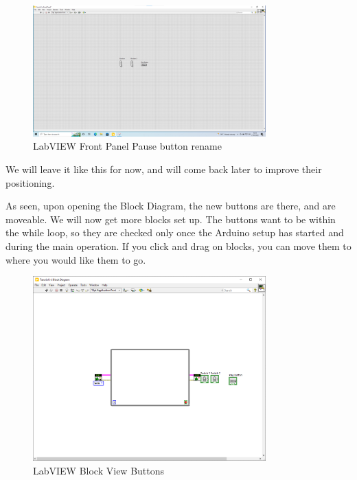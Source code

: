 \documentclass[a4paper,11pt]{report}
\begin{document}
\begin{figure}[H]
\centering
\includegraphics[width=0.8\textwidth]{screenshots/labview14}
\caption{LabVIEW Front Panel Pause button rename}
\end{figure}

We will leave it like this for now, and will come back later to improve their positioning.

As seen, upon opening the Block Diagram, the new buttons are there, and are moveable. We will now get more blocks set up. The buttons want to be within the while loop, so they are checked only once the Arduino setup has started and during the main operation. If you click and drag on blocks, you can move them to where you would like them to go.

\begin{figure}[H]
\centering
\includegraphics[width=0.8\textwidth]{screenshots/labview15}
\caption{LabVIEW Block View Buttons}
\end{figure}
\end{document}
